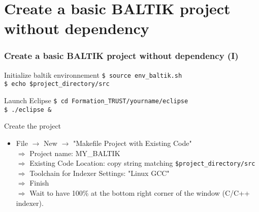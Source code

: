 \documentclass[10pt, hyperref={unicode=true,pdfusetitle, bookmarks=true,bookmarksnumbered=false,bookmarksopen=false, breaklinks=false,pdfborder={0 0 1},backref=true,colorlinks=true,linkcolor=darkblue,pageanchor, urlcolor=darkblue}]{beamer}
\begin{document}
\section{{\bf{Create a basic BALTIK project without dependency}}}
\begin{frame}
\tableofcontents[sections={1-5},currentsection, currentsubsection]
\end{frame}
\begin{frame}
\frametitle{Create a basic BALTIK project without dependency (I)}

\begin{block}{Initialize baltik environnement}
 \texttt{\$ source env\_baltik.sh } \\
 \texttt{\$ echo \$project\_directory/src }
\end{block}

\begin{block}{Launch Eclipse}
\texttt{\$ cd Formation\_TRUST/yourname/eclipse } \\
\texttt{\$ ./eclipse \& }
\end{block}

\begin{block}{Create the project}
\begin{itemize}
\item File $\rightarrow$ New $\rightarrow$ "Makefile Project with Existing Code" \\
  $\Rightarrow$ Project name: MY\_BALTIK \\
  $\Rightarrow$ Existing Code Location: copy string matching \texttt{\$project\_directory/src} \\
  $\Rightarrow$ Toolchain for Indexer Settings: "Linux GCC" \\
  $\Rightarrow$ Finish \\
  $\Rightarrow$ Wait to have 100\% at the bottom right corner of the window  (C/C++ indexer).
\end{itemize}
\end{block}

\end{frame}
\end{document}
